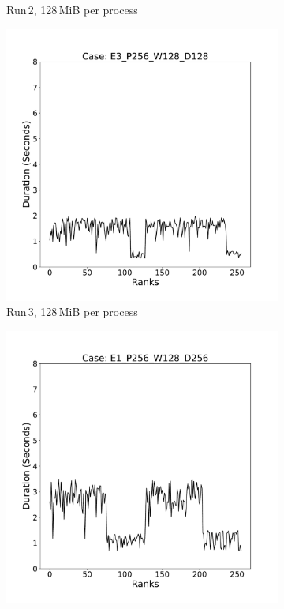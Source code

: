 \begin{figure}[h!]
\begin{subfigure}[b]{0.3\textwidth}
         \caption{Run\,2, 128\,MiB per process}
         \label{fig:E2_128}
     \end{subfigure}
      \hfill
     \begin{subfigure}[b]{0.3\textwidth}
         \centering
         \includegraphics[width=\textwidth, height=\textwidth]{figures/E3_P256_W128_D128.pdf}
         \caption{Run\,3, 128\,MiB per process}
         \label{fig:E3_128}
     \end{subfigure}
     \vfill
     \begin{subfigure}[b]{0.3\textwidth}
         \centering
         \includegraphics[width=\textwidth, height=\textwidth]{figures/E1_P256_W128_D256.pdf}

\end{subfigure}
\end{figure}
